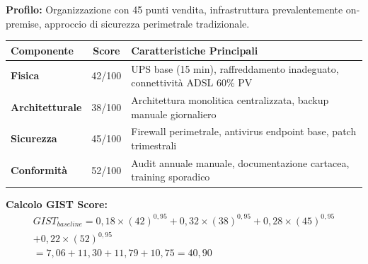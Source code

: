 \begin{tcolorbox}[
    colback=blue!5!white,
    colframe=blue!75!black,
    title={\textbf{Scenario 1:} GDO Tradizionale (Baseline)},
    fonttitle=\bfseries,
    boxrule=1.5pt,
    arc=2mm,
    breakable,
    width=\textwidth
]

\textbf{Profilo:} Organizzazione con 45 punti vendita, infrastruttura prevalentemente on-premise, approccio di sicurezza perimetrale tradizionale.

\begin{center}
\sffamily
\begin{tabularx}{\textwidth}{l c X}
\toprule
\textbf{Componente} & \textbf{Score} & \textbf{Caratteristiche Principali} \\
\midrule
\textbf{Fisica} & 42/100 & UPS base (15 min), raffreddamento inadeguato, connettività ADSL 60\% PV \\
\textbf{Architetturale} & 38/100 & Architettura monolitica centralizzata, backup manuale giornaliero \\
\textbf{Sicurezza} & 45/100 & Firewall perimetrale, antivirus endpoint base, patch trimestrali \\
\textbf{Conformità} & 52/100 & Audit annuale manuale, documentazione cartacea, training sporadico \\
\bottomrule
\end{tabularx}
\end{center}

\textbf{Calcolo GIST Score:}
\begin{multline}
GIST_{baseline} = 0,18 \times (42)^{0,95} + 0,32 \times (38)^{0,95} + 0,28 \times (45)^{0,95} \\+ 0,22 \times (52)^{0,95} \\
= 7,06 + 11,30 + 11,79 + 10,75 = \boxed{40,90}
\end{multline}

\end{tcolorbox}

